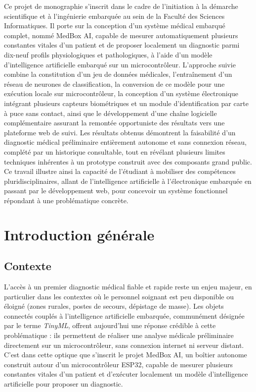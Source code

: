 \documentclass[12pt,a4paper]{report}
\begin{document}
Ce projet de monographie s'inscrit dans le cadre de l'initiation à la démarche scientifique et à l'ingénierie embarquée au sein de la Faculté des Sciences Informatiques. Il porte sur la conception d'un système médical embarqué complet, nommé MedBox AI, capable de mesurer automatiquement plusieurs constantes vitales d'un patient et de proposer localement un diagnostic parmi dix-neuf profils physiologiques et pathologiques, à l'aide d'un modèle d'intelligence artificielle embarqué sur un microcontrôleur. L'approche suivie combine la constitution d'un jeu de données médicales, l'entraînement d'un réseau de neurones de classification, la conversion de ce modèle pour une exécution locale sur microcontrôleur, la conception d'un système électronique intégrant plusieurs capteurs biométriques et un module d'identification par carte à puce sans contact, ainsi que le développement d'une chaîne logicielle complémentaire assurant la remontée opportuniste des résultats vers une plateforme web de suivi. Les résultats obtenus démontrent la faisabilité d'un diagnostic médical préliminaire entièrement autonome et sans connexion réseau, complété par un historique consultable, tout en révélant plusieurs limites techniques inhérentes à un prototype construit avec des composants grand public. Ce travail illustre ainsi la capacité de l'étudiant à mobiliser des compétences pluridisciplinaires, allant de l'intelligence artificielle à l'électronique embarquée en passant par le développement web, pour concevoir un système fonctionnel répondant à une problématique concrète.

\tableofcontents
\clearpage

\chapter{Introduction générale}

\section{Contexte}
L'accès à un premier diagnostic médical fiable et rapide reste un enjeu majeur, en particulier dans les contextes où le personnel soignant est peu disponible ou éloigné (zones rurales, postes de secours, dépistage de masse). Les objets connectés couplés à l'intelligence artificielle embarquée, communément désignée par le terme \textit{TinyML}, offrent aujourd'hui une réponse crédible à cette problématique : ils permettent de réaliser une analyse médicale préliminaire directement sur un microcontrôleur, sans connexion internet ni serveur distant. C'est dans cette optique que s'inscrit le projet MedBox AI, un boîtier autonome construit autour d'un microcontrôleur ESP32, capable de mesurer plusieurs constantes vitales d'un patient et d'exécuter localement un modèle d'intelligence artificielle pour proposer un diagnostic.
\end{document}

